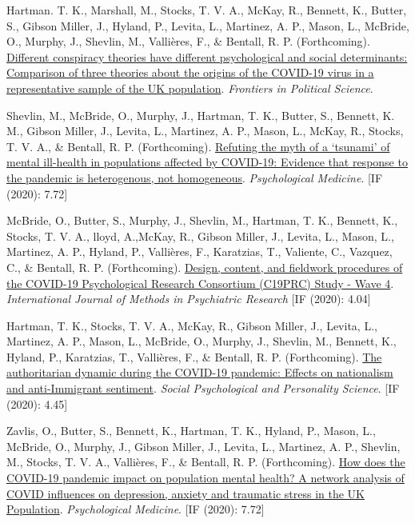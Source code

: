 \documentclass[12pt]{article}
\begin{document}
\begin{bibenum}
	\item Hartman. T. K., Marshall, M., Stocks, T. V. A., McKay, R.,  
	Bennett, K., Butter, S., Gibson Miller, J.,  Hyland, P., Levita, L., Martinez, A. P., 
	Mason, L., McBride, O., Murphy, J., Shevlin, M., Vallières, F., 
	\& Bentall, R. P.  (Forthcoming). 
		\href{https://doi.org/10.3389/fpos.2021.642510}{Different conspiracy theories have 
		different psychological and social determinants: Comparison of three 
		theories about the origins of the COVID-19 virus in a representative 
		sample of the UK population}.
		\emph{Frontiers in Political Science}.
	
	\item Shevlin, M.,  McBride, O., Murphy, J., Hartman, T. K., Butter, S., 
	Bennett, K. M., Gibson Miller, J., Levita, L., Martinez, A. P., Mason, L., 
	McKay, R., Stocks, T. V. A.,  \& Bentall, R. P. (Forthcoming). 
		\href{https://doi.org/10.1017/S0033291721001665}{Refuting the myth 
		of a ‘tsunami’ of mental ill-health in populations affected by 
		COVID-19: Evidence that response to the pandemic is heterogenous, 
		not homogeneous}.
		\emph{Psychological Medicine}. [IF (2020): 7.72]
		
	\item McBride, O., Butter, S., Murphy, J., Shevlin, M., Hartman, T. K., Bennett, K.,  Stocks, T. V. A., lloyd, A.,McKay, R.,  Gibson Miller, J.,  Levita, L., Mason, L., Martinez, A. P.,  Hyland, P., Vallières, F., Karatzias, T., Valiente, C., Vazquez, C., \& Bentall, R. P. (Forthcoming). \href{https://psyarxiv.com/nytxc/}{Design, content, and fieldwork procedures of the COVID-19 Psychological Research Consortium (C19PRC) Study - Wave 4}. 
	\emph{International Journal of Methods in Psychiatric Research} [IF (2020): 4.04]

	\item Hartman, T. K.,  Stocks, T. V. A., McKay, R., Gibson Miller, J., Levita, L., 
	Martinez, A. P., Mason, L., McBride, O., Murphy, J., Shevlin, M., Bennett, K., 
	Hyland, P., Karatzias, T., Vallières, F., \& Bentall, R. P. (Forthcoming). 
		\href{https://doi.org/10.1177/1948550620978023}{The authoritarian 
		dynamic during the COVID-19 pandemic: Effects on nationalism and 
		anti-Immigrant sentiment}.
		\emph{Social Psychological and Personality Science}. [IF (2020): 4.45]
	
\item Zavlis, O., Butter, S., Bennett, K., 
	Hartman, T. K., Hyland, P., Mason, L., 
	McBride, O., Murphy, J., Gibson Miller, J., 
	Levita, L., Martinez, A. P., Shevlin, M., 
	Stocks, T. V. A., Vallières, F., \& Bentall, R. P.
	(Forthcoming). 
	\href{https://doi.org/10.1017/S0033291721000635}
	{How does the COVID-19 pandemic impact on 
	population mental health? A network analysis 
	of COVID influences on depression, anxiety 
	and traumatic stress in the UK Population}. 
	\emph{Psychological Medicine}. [IF (2020): 7.72]
	

\end{bibenum}
\end{document}
